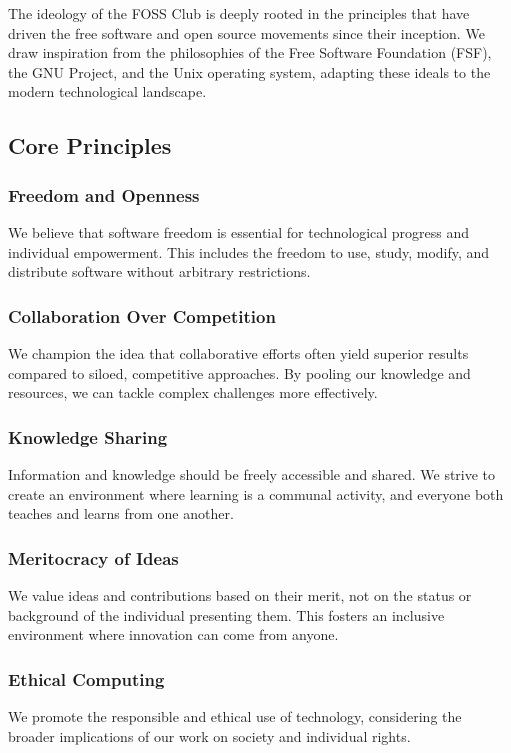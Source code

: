 \documentclass[12pt,a4paper]{article}
\begin{document}
The ideology of the FOSS Club is deeply rooted in the principles that have driven the free software and open source movements since their inception. We draw inspiration from the philosophies of the Free Software Foundation (FSF), the GNU Project, and the Unix operating system, adapting these ideals to the modern technological landscape.

\subsection{Core Principles}

\subsubsection{Freedom and Openness}
We believe that software freedom is essential for technological progress and individual empowerment. This includes the freedom to use, study, modify, and distribute software without arbitrary restrictions.

\subsubsection{Collaboration Over Competition}
We champion the idea that collaborative efforts often yield superior results compared to siloed, competitive approaches. By pooling our knowledge and resources, we can tackle complex challenges more effectively.

\subsubsection{Knowledge Sharing}
Information and knowledge should be freely accessible and shared. We strive to create an environment where learning is a communal activity, and everyone both teaches and learns from one another.

\subsubsection{Meritocracy of Ideas}
We value ideas and contributions based on their merit, not on the status or background of the individual presenting them. This fosters an inclusive environment where innovation can come from anyone.

\subsubsection{Ethical Computing}
We promote the responsible and ethical use of technology, considering the broader implications of our work on society and individual rights.
\end{document}
